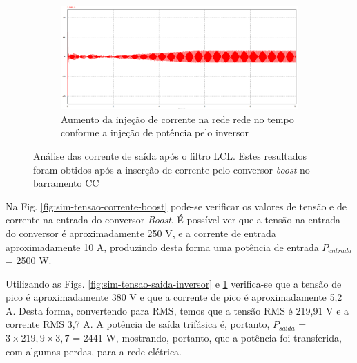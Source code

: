 \begin{figure}[!hbt]
	\begin{subfigure}[b]{0.5\textwidth}
		\includegraphics[width=\textwidth]{figuras/sim_figures/inversor_e_boost/injecao_corrente.PNG}
		\caption{Aumento da injeção de corrente na rede rede no tempo conforme a injeção de potência pelo inversor}
	\end{subfigure}
    \caption{Análise das corrente de saída após o filtro LCL. Estes resultados foram obtidos após a inserção de corrente pelo conversor \textit{boost} no barramento CC}
    \label{fig:sim-corrente-saida-inversor}
\end{figure}

Na Fig. \ref{fig:sim-tensao-corrente-boost} pode-se verificar os valores de tensão e de corrente na entrada do conversor \textit{Boost}.
É possível ver que a tensão na entrada do conversor é aproximadamente 250 V, e a corrente de entrada aproximadamente 10 A, produzindo desta forma uma potência de entrada $P_{entrada}$ = 2500 W.

Utilizando as Figs. \ref{fig:sim-tensao-saida-inversor} e \ref{fig:sim-corrente-saida-inversor} verifica-se que a tensão de pico é aproximadamente 380 V e que a corrente de pico é aproximadamente 5,2 A.
Desta forma, convertendo para RMS, temos que a tensão RMS é 219,91 V e a corrente RMS 3,7 A. A potência de saída trifásica é, portanto, $P_{saída}$ = $ 3 \times 219,9 \times 3,7$ = 2441 W, mostrando, portanto, que a potência foi transferida, com algumas perdas, para a rede elétrica.

